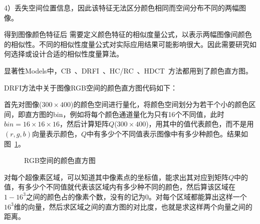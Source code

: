 \documentclass[12pt]{article}
\begin{document}
4）丢失空间位置信息，因此该特征无法区分颜色相同而空间分布不同的两幅图像。

得到图像颜色特征后 需要定义颜色特征的相似度量公式，以表示两幅图像间颜色的相似性。不同的相似性度量公式对实际应用结果可能影响很大。因此需要研究如何选择或设计合适的相似性度量算法。

显著性Models中，CB~\cite{jiang2011automatic}、DRFI~\cite{jiang2013salient}、HC/RC~\cite{cheng2011global}、HDCT~\cite{kim2014salient}方法都用到了颜色直方图。

DRFI方法中关于图像RGB空间的颜色直方图代码如下：



首先对图像($300 \times 400$)的颜色空间进行量化，将颜色空间划分为若干个小的颜色区间，即直方图的bin，例如将每个颜色通道量化为只有16个不同值，此时$bin = 16 \times 16 \times 16$，然后计算矩阵$Q$($300 \times 400$)，用其中的值代表颜色，而不是用$(r, g, b)$向量表示颜色，$Q$中有多少个不同值表示图像中有多少种颜色。结果如图~\ref{fig: RGBhistogram}。

\begin{figure}
  \centering 
  \caption{RGB空间的颜色直方图}
  \label{fig: RGBhistogram} %
\end{figure}

对每个超像素区域，可以知道其中像素点的坐标值，能求出其对应到矩阵$Q$中的值，有多少个不同值就代表该区域内有多少种不同的颜色，然后算该区域在$1-16^3$之间的颜色占的像素个数，没有的记为0。对每个区域都能算出这样一个$16^3$维的向量，然后求区域之间的直方图的对比度，也就是求这样两个向量之间的距离。
\end{document}
